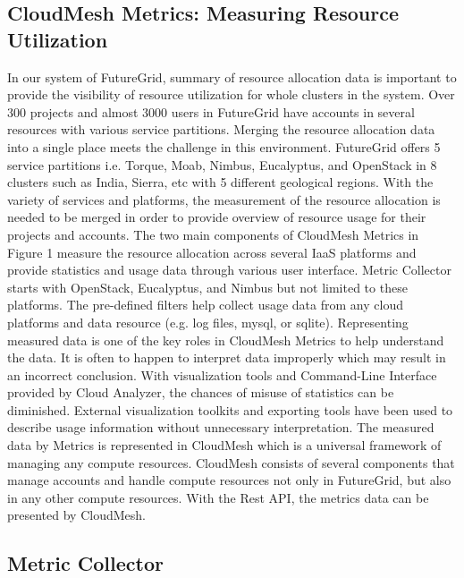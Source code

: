 \documentclass{tex/sig-alternate}
\begin{document}
{\subsection{CloudMesh Metrics: Measuring Resource Utilization}

In our system of FutureGrid, summary of resource allocation data is important to provide the visibility of resource utilization for whole clusters in the system. Over 300 projects and almost 3000 users in FutureGrid have accounts in several resources with various service partitions. Merging the resource allocation data into a single place meets the challenge in this environment. FutureGrid offers 5 service partitions i.e. Torque, Moab, Nimbus, Eucalyptus, and OpenStack in 8 clusters such as India, Sierra, etc with 5 different geological regions. With the variety of services and platforms, the measurement of the resource allocation is needed to be merged in order to provide overview of resource usage for their projects and accounts. The two main components of CloudMesh Metrics in Figure 1 measure the resource allocation across several IaaS platforms and provide statistics and usage data through various user interface. Metric Collector starts with OpenStack, Eucalyptus, and Nimbus but not limited to these platforms. The pre-defined filters help collect usage data from any cloud platforms and data resource (e.g. log files, mysql, or sqlite). Representing measured data is one of the key roles in CloudMesh Metrics to help understand the data. It is often to happen to interpret data improperly which may result in an incorrect conclusion. With visualization tools and Command-Line Interface provided by Cloud Analyzer, the chances of misuse of statistics can be diminished. External visualization toolkits and exporting tools have been used to describe usage information without unnecessary interpretation. The measured data by Metrics is represented in CloudMesh which is a universal framework of managing any compute resources. CloudMesh consists of several components that manage accounts and handle compute resources not only in FutureGrid, but also in any other compute resources. With the Rest API, the metrics data can be presented by CloudMesh.

\subsection{Metric Collector}

}
\end{document}
